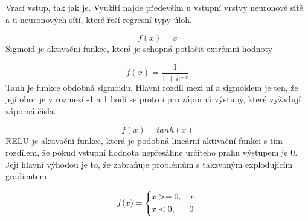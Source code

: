 Vrací vstup, tak jak je. Využití najde především u vstupní vrstvy neuronové sítě a u neuronových sítí, které řeší regresní typy úloh.
\\
$$f(x) = x$$
Sigmoid je aktivační funkce, která je schopná potlačit extrémní hodnoty 
$$f(x) = \frac{1}{1 + e^{-x}}$$
Tanh je funkce obdobná sigmoidu. Hlavní rozdíl mezi ní a sigmoidem je ten, že její obor je v rozmezí -1 a 1 hodí se proto i pro záporná výstupy, které vyžadují záporná čísla. \cite[s.~67]{fundementalsOfDeepLearning}
$$f(x) = tanh(x)$$
RELU je aktivační funkce, která je podobná lineární aktivační funkci s tím rozdílem, že pokud vstupní hodnota nepřesáhne určitého prahu výstupem je 0. Její hlavní výhodou je to, že zabraňuje problémům s takzvaným explodujícím gradientem \cite[s.~69]{fundementalsOfDeepLearning} \\
\[ 
f(x) = 
\begin{dcases*} 
\text{$x>=0$,} & $x$ \\ 
\text{$x<0$,} & 0 
\end{dcases*} 
\]
